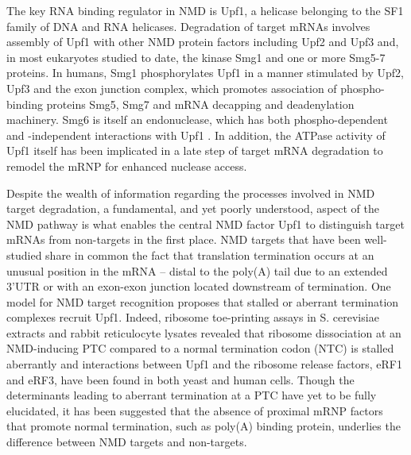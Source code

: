 The key RNA binding regulator in NMD is Upf1, a helicase belonging to the SF1 family of DNA and RNA helicases\cite{Fairman-Williams2010}. Degradation of target mRNAs involves assembly of Upf1 with other NMD protein factors including Upf2 and Upf3 and, in most eukaryotes studied to date, the kinase Smg1 and one or more Smg5-7 proteins\cite{Kervestin2012, Schweingruber2013}. In humans, Smg1 phosphorylates Upf1 in a manner stimulated by Upf2, Upf3 and the exon junction complex\cite{Kashima2006}, which promotes association of phospho-binding proteins Smg5, Smg7 and mRNA decapping and deadenylation machinery\cite{Chakrabarti2014, Cho2013, Loh2013, Okada-Katsuhata2012}. Smg6 is itself an endonuclease, which has both phospho-dependent and -independent interactions with Upf1 \cite{Chakrabarti2014, Eberle2009, Nicholson2014, Okada-Katsuhata2012}. In addition, the ATPase activity of Upf1 itself has been implicated in a late step of target mRNA degradation to remodel the mRNP for enhanced nuclease access\cite{Franks2010}.

Despite the wealth of information regarding the processes involved in NMD target degradation, a fundamental, and yet poorly understood, aspect of the NMD pathway is what enables the central NMD factor Upf1 to distinguish target mRNAs from non-targets in the first place. NMD targets that have been well-studied share in common the fact that translation termination occurs at an unusual position in the mRNA – distal to the poly(A) tail due to an extended 3’UTR or with an exon-exon junction located downstream of termination\cite{Schweingruber2013}. One model for NMD target recognition proposes that stalled or aberrant termination complexes recruit Upf1\cite{Kervestin2012, Schweingruber2013}. Indeed, ribosome toe-printing assays in S. cerevisiae extracts and rabbit reticulocyte lysates revealed that ribosome dissociation at an NMD-inducing PTC compared to a normal termination codon (NTC) is stalled aberrantly\cite{Amrani2004, Peixeiro2012} and interactions between Upf1 and the ribosome release factors, eRF1 and eRF3, have been found in both yeast and human cells\cite{Czaplinski1998, Ivanov2008, Kashima2006, Singh2008}. Though the determinants leading to aberrant termination at a PTC have yet to be fully elucidated, it has been suggested that the absence of proximal mRNP factors that promote normal termination, such as poly(A) binding protein, underlies the difference between NMD targets and non-targets\cite{Cosson2002, Ivanov2008, Kervestin2012, Uchida2002}.

